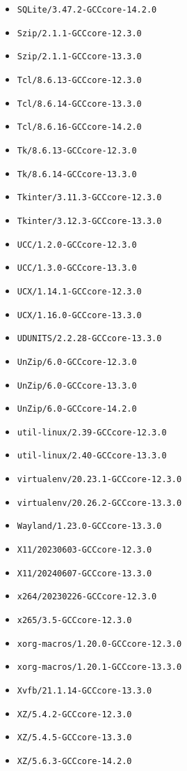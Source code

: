 \begin{multicols}{3}
\begin{itemize}
\item \verb|SQLite/3.47.2-GCCcore-14.2.0|
\item \verb|Szip/2.1.1-GCCcore-12.3.0|
\item \verb|Szip/2.1.1-GCCcore-13.3.0|
\item \verb|Tcl/8.6.13-GCCcore-12.3.0|
\item \verb|Tcl/8.6.14-GCCcore-13.3.0|
\item \verb|Tcl/8.6.16-GCCcore-14.2.0|
\item \verb|Tk/8.6.13-GCCcore-12.3.0|
\item \verb|Tk/8.6.14-GCCcore-13.3.0|
\item \verb|Tkinter/3.11.3-GCCcore-12.3.0|
\item \verb|Tkinter/3.12.3-GCCcore-13.3.0|
\item \verb|UCC/1.2.0-GCCcore-12.3.0|
\item \verb|UCC/1.3.0-GCCcore-13.3.0|
\item \verb|UCX/1.14.1-GCCcore-12.3.0|
\item \verb|UCX/1.16.0-GCCcore-13.3.0|
\item \verb|UDUNITS/2.2.28-GCCcore-13.3.0|
\item \verb|UnZip/6.0-GCCcore-12.3.0|
\item \verb|UnZip/6.0-GCCcore-13.3.0|
\item \verb|UnZip/6.0-GCCcore-14.2.0|
\item \verb|util-linux/2.39-GCCcore-12.3.0|
\item \verb|util-linux/2.40-GCCcore-13.3.0|
\item \verb|virtualenv/20.23.1-GCCcore-12.3.0|
\item \verb|virtualenv/20.26.2-GCCcore-13.3.0|
\item \verb|Wayland/1.23.0-GCCcore-13.3.0|
\item \verb|X11/20230603-GCCcore-12.3.0|
\item \verb|X11/20240607-GCCcore-13.3.0|
\item \verb|x264/20230226-GCCcore-12.3.0|
\item \verb|x265/3.5-GCCcore-12.3.0|
\item \verb|xorg-macros/1.20.0-GCCcore-12.3.0|
\item \verb|xorg-macros/1.20.1-GCCcore-13.3.0|
\item \verb|Xvfb/21.1.14-GCCcore-13.3.0|
\item \verb|XZ/5.4.2-GCCcore-12.3.0|
\item \verb|XZ/5.4.5-GCCcore-13.3.0|
\item \verb|XZ/5.6.3-GCCcore-14.2.0|

\end{itemize}
\end{multicols}

